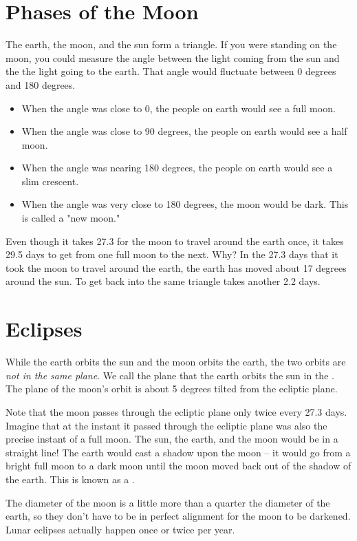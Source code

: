 \section{Phases of the Moon}

The earth, the moon, and the sun form a triangle.   If you were standing on the moon,  you could measure the angle between the light coming from the sun and the the light going to the earth.   That angle would fluctuate between 0 degrees and 180 degrees.  
\begin{itemize}
\item When the angle was close to 0,  the people on earth would see a full moon.  
\item When the angle was close to 90 degrees,  the people on earth would see a half moon. 
\item When the angle was nearing 180 degrees, the people on earth would see a slim crescent.
\item When the angle was very close to 180 degrees,  the moon would be dark.  This is called a "new moon." 
\end{itemize}


Even though it takes 27.3 for the moon to travel around the earth once,   it takes 29.5 days to get from one full moon to the next. Why?  In the 27.3 days that it took the moon to travel around the earth,  the earth has moved about 17 degrees around the sun.  To get back into the same triangle takes another 2.2 days.

\section{Eclipses}

While the earth orbits the sun and the moon orbits the earth,  the two orbits are \emph{not in the same plane}.
We call the plane that the earth orbits the sun in the .   The plane of the moon's orbit is about  5 degrees tilted from the ecliptic plane.

Note that the moon passes through the ecliptic plane only twice every 27.3 days.   Imagine that at the instant it passed through the ecliptic plane was also the precise instant of a full moon.    The sun, the earth, and the moon would be in a straight line!  The earth would cast a shadow upon the moon -- it would go from a bright full moon to a dark moon until the moon moved back out of the shadow of the earth.   This is known as a .

The diameter of the moon is a little more than a quarter the diameter of the earth,  so they don't have to be in perfect alignment for the moon to be darkened.   Lunar eclipses actually happen once or twice per year.

